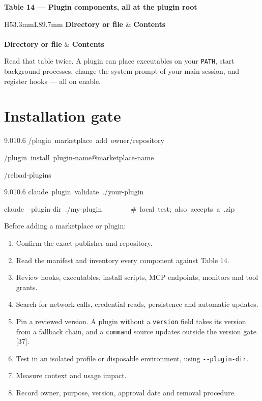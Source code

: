 \documentclass[11pt,a4paper,twoside,openany]{book}
\newcommand{\cl}[1]{\noindent\mbox{#1}\par}
\newcommand{\tabcaption}[1]{\par\addvspace{2.6mm}\needspace{4\baselineskip}%
  {\sffamily\footnotesize\bfseries\color{deepindigo}#1\par}\addvspace{1.2mm}}
\begin{document}
  \tabcaption{Table 14 — Plugin components, all at the plugin root}
  {\footnotesize\begin{longtable}{H{53.3mm}L{89.7mm}}
  \toprule
\textbf{Directory or file} & \textbf{Contents} \\
\midrule\endfirsthead
  \\[1.2mm]
  \toprule
\textbf{Directory or file} & \textbf{Contents} \\
\midrule\endhead
  \bottomrule\endfoot
  \bottomrule\endlastfoot
  \tblrows
  \end{longtable}}%
\else
  \noindent\tblbody
\fi
\par\addvspace{2.6mm}
\endgroup

Read that table twice. A plugin can place executables on your \texttt{PATH}, start background processes, change the system prompt of your main session, and register hooks — all on enable.


\FloatBarrier
\setcounter{section}{1}
\section{Installation gate}

\begin{codeblock}{9.0}{10.6}
\cl{/plugin~marketplace~add~owner/repository}
\cl{/plugin~install~plugin-name@marketplace-name}
\cl{/reload-plugins}
\end{codeblock}

\begin{codeblock}{9.0}{10.6}
\cl{claude~plugin~validate~./your-plugin}
\cl{claude~--plugin-dir~./my-plugin~~~~~~~~\#~local~test;~also~accepts~a~.zip}
\end{codeblock}

Before adding a marketplace or plugin:


\begin{enumerate}
\item Confirm the exact publisher and repository.
\item Read the manifest and inventory every component against Table 14.
\item Review hooks, executables, install scripts, MCP endpoints, monitors and tool grants.
\item Search for network calls, credential reads, persistence and automatic updates.
\item Pin a reviewed version. A plugin without a \texttt{version} field takes its version from a fallback chain, and a \texttt{command} source updates outside the version gate [37].
\item Test in an isolated profile or disposable environment, using \texttt{-\allowbreak{}-\allowbreak{}plugin-\allowbreak{}dir}.
\item Measure context and usage impact.
\item Record owner, purpose, version, approval date and removal procedure.
\end{enumerate}
\end{document}
